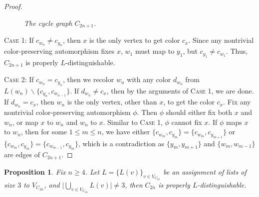 \documentclass[12pt,reqno,a4paper]{amsart}
\theoremstyle{definition}
\newtheorem{prop}[defn]{Proposition}
\begin{document}
\begin{proof}
\begin{figure}[!ht]
\begin{minipage}{\textwidth}
\end{minipage}
\caption{\em The cycle graph $C_{2n+1}$.}
\label{Figure 2}
\end{figure}
\textsc{Case 1:} If $c_{w_{n}}\neq c_{y_{n}}$, then $x$ is the only vertex to get color $c_{x}$. Since any nontrivial color-preserving automorphism fixes $x$, $w_{1}$ must map to $y_{1}$, but $c_{y_{1}}\neq c_{w_{1}}$. Thus, $C_{2n+1}$ is properly $L$-distinguishable.

\textsc{Case 2:} If $c_{w_{n}}= c_{y_{n}}$, then we recolor $w_{n}$ with any color $d_{w_{n}}$ from $L(w_{n})\backslash\{c_{y_{n}},c_{w_{n-1}}\}$. If $d_{w_{n}}\neq c_{x}$, then by the arguments of \textsc{Case 1}, we are done. If $d_{w_{n}}=c_{x}$, then $w_{n}$ is the only vertex, other than $x$, to get the color $c_{x}$. Fix any nontrivial color-preserving automorphism $\phi$. Then $\phi$ should either fix both $x$ and $w_{n}$, or map $x$ to $w_{n}$ and $w_{n}$ to $x$.
Similar to \textsc{Case 1}, $\phi$ cannot fix $x$. If $\phi$ maps $x$ to $w_{n}$, then for some $1\leq m\leq n$, we have either $\{c_{w_{m}},c_{y_{m}}\}=\{c_{w_{m}},c_{y_{m+1}}\}$ or $\{c_{w_{m}},c_{y_{m}}\}=\{c_{w_{m-1}},c_{y_{m}}\}$, which is a contradiction as $\{y_{m},y_{m+1}\}$ and $\{w_{m},w_{m-1}\}$ are edges of $C_{2n+1}$.   
\end{proof}

\begin{prop}\label{Proposition 2.5}
{\em Fix $n\geq 4$. Let $L=\{L(v)\}_{v\in V_{C_{2n}}}$ be an assignment of lists of size $3$ to $V_{C_{2n}}$, and $\vert \bigcup_{v\in V_{C_{2n}}} L(v)\vert \neq 3$, then $C_{2n}$ is properly $L$-distinguishable.}
\end{prop}
\end{document}
